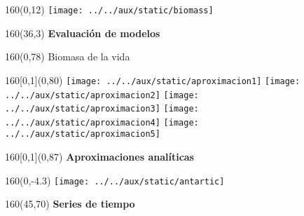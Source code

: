 \documentclass[shownotes,aspectratio=169]{beamer}
\begin{document}
\begin{frame}
\begin{textblock}{160}(0,12)
\texttt{[image: ../../aux/static/biomass]}
\end{textblock}

\begin{textblock}{160}(36,3)
\LARGE \textcolor{black!75}{\fontsize{22}{0}\selectfont \textbf{Evaluación de modelos}}
\end{textblock}

\begin{textblock}{160}(0,78) \centering
\Large \textcolor{black!75}{Biomasa de la vida}
\end{textblock}

\end{frame}

\begin{frame}
\begin{textblock}{160}[0,1](0,80)
\texttt{[image: ../../aux/static/aproximacion1]}
\hspace{-0.1cm}
\texttt{[image: ../../aux/static/aproximacion2]}
\hspace{-0.1cm}
\texttt{[image: ../../aux/static/aproximacion3]}
\hspace{-0.1cm}
\texttt{[image: ../../aux/static/aproximacion4]}
\hspace{-0.1cm}
\texttt{[image: ../../aux/static/aproximacion5]}
\end{textblock}

\begin{textblock}{160}[0,1](0,87) \centering
\LARGE \textcolor{black!65}{\fontsize{22}{0}\selectfont \textbf{Aproximaciones analíticas}}
\end{textblock}
\end{frame}

\begin{frame}
\begin{textblock}{160}(0,-4.3) \centering
\texttt{[image: ../../aux/static/antartic]}
\end{textblock}
\begin{textblock}{160}(45,70) \centering
\LARGE \textcolor{black!16}{\fontsize{22}{0}\selectfont \textbf{Series de tiempo}}
\end{textblock}

\end{frame}
\end{document}
